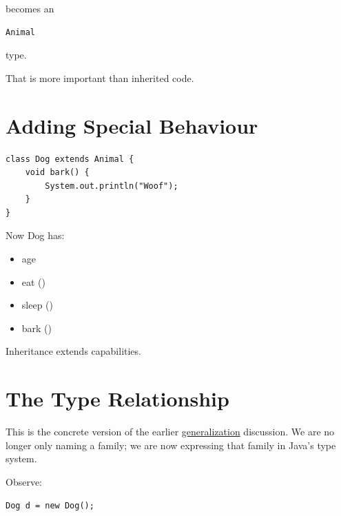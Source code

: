 \documentclass[11pt,a4paper]{book}
\begin{document}
becomes an

\begin{verbatim}
Animal
\end{verbatim}

type.


That is more important than inherited code.


\section{Adding Special Behaviour}

\begin{verbatim}
class Dog extends Animal {
    void bark() {
        System.out.println("Woof");
    }
}
\end{verbatim}


Now Dog has:

\begin{itemize}
\item age
\item eat ()
\item sleep ()
\item bark ()
\end{itemize}


Inheritance extends capabilities.


\section{The Type Relationship}\label{sec:inheritance_type_relationship}

This is the concrete version of the earlier \hyperref[chap:generalization]{generalization} discussion. We are no longer only naming a family; we are now expressing that family in Java's type system.

Observe:

\begin{verbatim}
Dog d = new Dog();
\end{verbatim}

\end{document}
